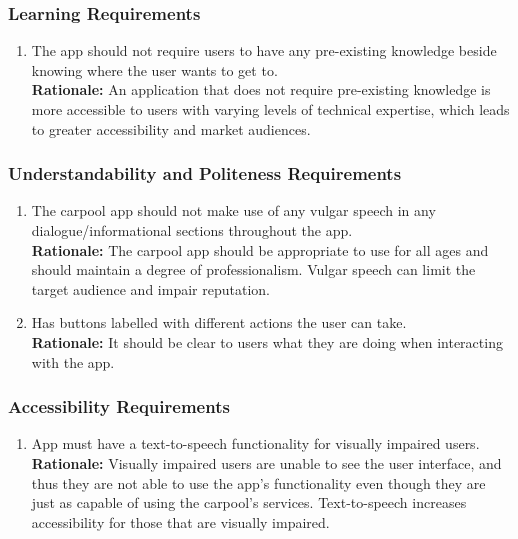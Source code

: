 \documentclass[]{article}
\begin{document}
\subsubsection{Learning Requirements}
\label{ssub:learning_requirements}
\begin{enumerate}[{UH-L}1. ]
	\item The app should not require users to have any pre-existing knowledge beside knowing where the user wants to get to.\\
	{\bf Rationale:} An application that does not require pre-existing knowledge is more accessible to users with varying levels of technical expertise, which leads to greater accessibility and market audiences.
\end{enumerate}

\subsubsection{Understandability and Politeness Requirements}
\label{ssub:understandability_and_politeness_requirements}
\begin{enumerate}[{UH-UP}1. ]
	\item The carpool app should not make use of any vulgar speech in any dialogue/informational sections throughout the app.\\
	{\bf Rationale:} The carpool app should be appropriate to use for all ages and should maintain a degree of professionalism. Vulgar speech can limit the target audience and impair reputation.
	\item Has buttons labelled with different actions the user can take.\\
	{\bf Rationale:} It should be clear to users what they are doing when interacting with the app.
\end{enumerate}

\subsubsection{Accessibility Requirements}
\label{ssub:accessibility_requirements}
\begin{enumerate}[{UH-A}1. ]
	\item App must have a text-to-speech functionality for visually impaired users.\\
	{\bf Rationale:} Visually impaired users are unable to see the user interface, and thus they are not able to use the app's functionality even though they are just as capable of using the carpool's services. Text-to-speech increases accessibility for those that are visually impaired.
\end{enumerate}
\end{document}
